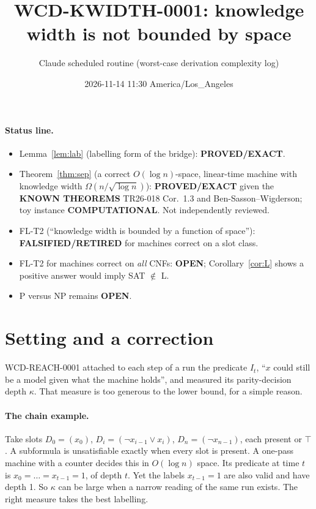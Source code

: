 \documentclass[11pt]{article}
\title{WCD-KWIDTH-0001: knowledge width is not bounded by space}
\author{Claude scheduled routine (worst-case derivation complexity log)}
\date{2026-11-14 11:30 America/Los\_Angeles}
\begin{document}
\maketitle

\paragraph{Status line.}
\begin{itemize}
\item Lemma~\ref{lem:lab} (labelling form of the bridge): \textbf{PROVED/EXACT}.
\item Theorem~\ref{thm:sep} (a correct $O(\log n)$-space, linear-time machine with knowledge width $\Omega(n/\sqrt{\log n})$): \textbf{PROVED/EXACT} given the \textbf{KNOWN THEOREMS} TR26-018 Cor.~1.3 and Ben-Sasson--Wigderson; toy instance \textbf{COMPUTATIONAL}. Not independently reviewed.
\item FL-T2 (``knowledge width is bounded by a function of space''): \textbf{FALSIFIED/RETIRED} for machines correct on a slot class.
\item FL-T2 for machines correct on \emph{all} CNFs: \textbf{OPEN}; Corollary~\ref{cor:L} shows a positive answer would imply SAT $\notin$ L.
\item P versus NP remains \textbf{OPEN}.
\end{itemize}

\section{Setting and a correction}
WCD-REACH-0001 attached to each step of a run the predicate $I_t$, ``$x$ could still be a model given what the machine holds'', and measured its parity-decision depth $\kappa$. That measure is too generous to the lower bound, for a simple reason.

\paragraph{The chain example.} Take slots $D_0=(x_0)$, $D_i=(\neg x_{i-1}\vee x_i)$, $D_n=(\neg x_{n-1})$, each present or $\top$. A subformula is unsatisfiable exactly when every slot is present. A one-pass machine with a counter decides this in $O(\log n)$ space. Its predicate at time $t$ is $x_0=\dots=x_{t-1}=1$, of depth $t$. Yet the labels $x_{t-1}=1$ are also valid and have depth 1. So $\kappa$ can be large when a narrow reading of the same run exists. The right measure takes the best labelling.
\end{document}
